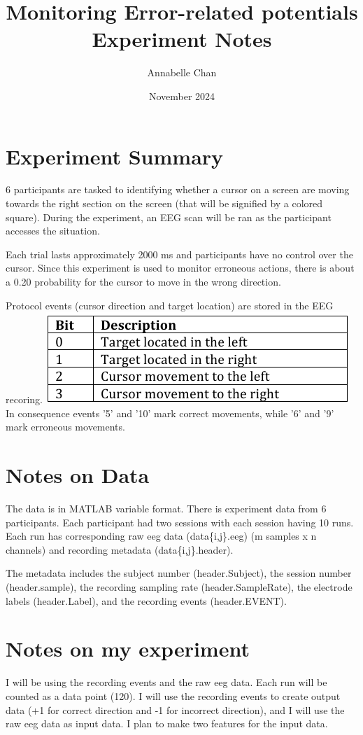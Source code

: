 \documentclass[12pt]{article}
\title{Monitoring Error-related potentials Experiment Notes}
\author{Annabelle Chan}
\date{November 2024}
\begin{document}
\maketitle

\section{Experiment Summary}
6 participants are tasked to identifying whether a cursor on a screen are moving towards the right section on the screen (that will be signified by a colored square). During the experiment, an EEG scan will be ran as the participant accesses the situation.

Each trial lasts approximately 2000 ms and participants have no control over the cursor. Since this experiment is used to monitor erroneous actions, there is about a 0.20 probability for the cursor to move in the wrong direction.

Protocol events (cursor direction and target location) are stored in the EEG recoring. 
\includegraphics[scale=1]{ProtocolEventTable}
In consequence events '5' and '10' mark correct movements, while '6' and '9' mark erroneous movements.

\section{Notes on Data}
The data is in MATLAB variable format. There is experiment data from 6 participants. Each participant had two sessions with each session having 10 runs. Each run has corresponding raw eeg data (data\{i,j\}.eeg) (m samples x n channels) and recording metadata (data\{i,j\}.header). 

The metadata includes the subject number (header.Subject), the session number (header.sample), the recording sampling rate (header.SampleRate), the electrode labels (header.Label), and the recording events (header.EVENT).

\section{Notes on my experiment}
I will be using the recording events and the raw eeg data. Each run will be counted as a data point (120). I will use the recording events to create output data (+1 for correct direction and -1 for incorrect direction), and I will use the raw eeg data as input data. I plan to make two features for the input data.
\end{document}

